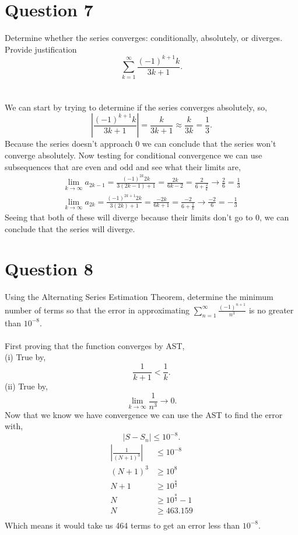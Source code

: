 \documentclass[a4paper]{article}
\begin{document}
\section*{Question 7}%
\label{sec:Question 7}
Determine whether the series converges: conditionally, absolutely, or diverges. Provide justification
\[
\sum_{ k=1 } ^{ \infty } \frac{ \left( -1 \right) ^{ k+1 }k }{ 3k+1 }
.\]
\\ \\ 
We can start by trying to determine if the series converges absolutely, so,
\[
\left| \frac{ \left( -1 \right) ^{ k+1 }k }{ 3k+1 } \right|= \frac{ k }{ 3k+1 } \approx \frac{ k }{ 3k } =\frac{ 1 }{ 3 } 
.\] 
Because the series doesn't approach 0 we can conclude that the series won't converge absolutely. Now testing for conditional convergence we can use subsequences that are even and odd and see what their limits are, 
\begin{gather*}
\lim_{ k \to \infty} a_{ 2k -1 } = \frac{ \left( -1 \right) ^{ 2k }2k }{ 3\left( 2k -1 \right) +1 } = \frac{ 2k }{ 6k- 2 } = \frac{ 2 }{ 6 + \frac{ 2 }{ k } } \to \frac{ 2 }{ 6 } = \frac{ 1 }{ 3 } \\
\lim_{ k \to \infty} a_{ 2k } = \frac{ \left( -1 \right) ^{ 2k+1 }2k }{ 3\left( 2k \right) +1 } = \frac{ -2k }{ 6k+1 } = \frac{ -2 }{ 6 + \frac{ 1 }{ k } } \to \frac{ -2 }{ 6 } = -\frac{ 1 }{ 3 }
\end{gather*}
Seeing that both of these will diverge because their limits don't go to 0, we can conclude that the series will diverge.
\section*{Question 8}%
\label{sec:Question 8}
Using the Alternating Series Estimation Theorem, determine the minimum number of terms so that the error in approximating $ \sum_{ n=1 } ^{ \infty } \frac{ \left( -1 \right) ^{ n+1 } }{ n^3 } $ is no greater than $ 10^{ -8 } $. \\ \\ 
First proving that the function converges by AST, \\
(i) True by,
\[
\frac{ 1 }{ k+1 } < \frac{ 1 }{ k } 
.\] 
(ii) True by,
\[
\lim_{ k \to \infty} \frac{ 1 }{ n^3 } \to 0
.\] 
Now that we know we have convergence we can use the AST to find the error with,
\[
\left| S-S_n \right| \le 10^{ -8 }
.\] 
\begin{align*}
	\left| \frac{ 1 }{ \left( N+1 \right) ^3 }  \right| &\le 10^{ -8 } \\
	\left( N+1 \right) ^3 &\ge 10^{ 8 } \\
	N+1 &\ge 10^{ \frac{ 8 }{ 3 }  } \\
	N & \ge 10^{ \frac{ 8 }{ 3 }  }- 1 \\
	N &\ge 463.159 \\
\end{align*}
Which means it would take us 464 terms to get an error less than $ 10^{ -8 } $.
\end{document}

